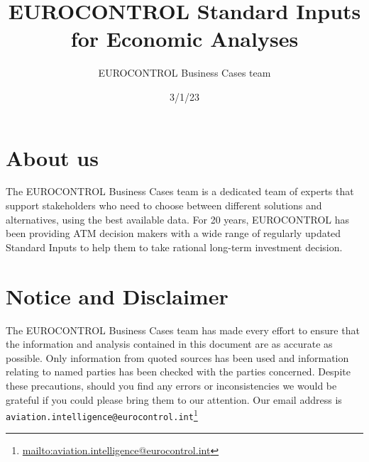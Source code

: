 \documentclass[
  11pt,
  a4paper,
]{book}
\title{EUROCONTROL Standard Inputs for Economic Analyses}
\author{EUROCONTROL Business Cases team}
\date{3/1/23}
\renewcommand*\contentsname{Table of contents}
\newcommand\contentsname{Table of contents}
\DeclareRobustCommand{\href}[2]{#2\footnote{\url{#1}}}
\begin{document}
\frontmatter
\maketitle
\ifdefined\Shaded\renewenvironment{Shaded}{\begin{tcolorbox}[boxrule=0pt, sharp corners, interior hidden, frame hidden, borderline west={3pt}{0pt}{shadecolor}, enhanced, breakable]}{\end{tcolorbox}}\fi

\renewcommand*\contentsname{Table of contents}
{
\hypersetup{linkcolor=}
\setcounter{tocdepth}{2}
\tableofcontents
}
\mainmatter
{}

\hypertarget{about-us}{%
\chapter*{About us}\label{about-us}}


The EUROCONTROL Business Cases team is a dedicated team of experts that
support stakeholders who need to choose between different solutions and
alternatives, using the best available data. For 20 years, EUROCONTROL
has been providing ATM decision makers with a wide range of regularly
updated Standard Inputs to help them to take rational long-term
investment decision.


\hypertarget{notice-and-disclaimer}{%
\chapter*{Notice and Disclaimer}\label{notice-and-disclaimer}}


The EUROCONTROL Business Cases team has made every effort to ensure that
the information and analysis contained in this document are as accurate
as possible. Only information from quoted sources has been used and
information relating to named parties has been checked with the parties
concerned. Despite these precautions, should you find any errors or
inconsistencies we would be grateful if you could please bring them to
our attention. Our email address is
\href{mailto:aviation.intelligence@eurocontrol.int}{\nolinkurl{aviation.intelligence@eurocontrol.int}}
\end{document}
